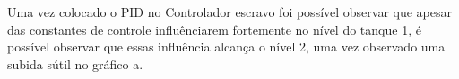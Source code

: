 Uma vez colocado o PID no Controlador escravo foi possível observar que apesar das constantes de controle influênciarem
fortemente no nível do tanque 1, é possível observar que essas influência alcança o nível 2, uma vez observado uma subida
sútil no gráfico a.